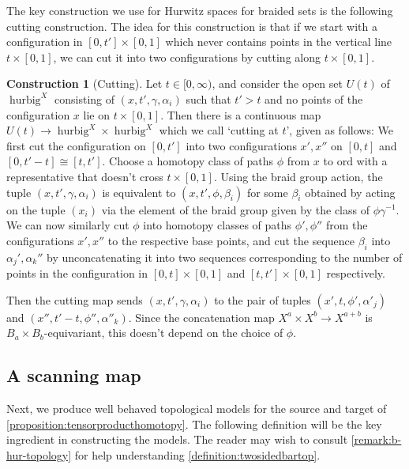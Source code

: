 \documentclass[12 pt]{amsart}
\theoremstyle{plain}
\theoremstyle{definition}
\newtheorem{construction}[theorem]{Construction}
\theoremstyle{remark}
\numberwithin{equation}{section}
\DeclareMathOperator\conf{Conf}
\begin{document}
The key construction we use for Hurwitz spaces for braided sets is the following
cutting construction.
The idea for this construction is that if we start with a configuration in
$[0,t'] \times [0,1]$ which never contains points in the vertical line $t
\times[0,1]$, we can cut it into two configurations by cutting along $t
\times [0,1]$.
\begin{construction}[Cutting]\label{construction:cutting}
	Let $t \in [0,\infty)$, and consider the open set $U(t)$ of $\operatorname{hurbig}^X$ consisting of  $(x,t',\gamma,\alpha_i)$ such that $t'>t$ and no points of the configuration $x$ lie on $t\times [0,1]$. Then there is a continuous map $U(t)\to \operatorname{hurbig}^X\times \operatorname{hurbig}^X$ which we call `cutting at $t$', given as follows: We first cut the configuration on $[0,t']$ into two configurations $x',x''$ on $[0,t]$ and $[0,t'-t]\cong [t,t']$. Choose a homotopy class of paths $\phi$ from $x$ to $\mathrm{ord}$ with a representative that doesn't cross $t\times [0,1]$. 
	Using the braid group action, the tuple $(x,t',\gamma,\alpha_i)$ is
	equivalent to $(x,t',\phi,\beta_i)$ for some $\beta_i$ obtained by
	acting on the tuple $(x_i)$ via the element of the braid group given by
	the class of $\phi \gamma^{-1}$. We can now similarly cut $\phi$ into
	homotopy classes of paths $\phi',\phi''$ from the configurations
	$x',x''$ to the respective base points, and cut the sequence $\beta_i$
	into $\alpha_j',\alpha_k''$ by unconcatenating it into two sequences corresponding to the number of points in the configuration in $[0,t]\times [0,1]$ and $[t,t']\times [0,1]$ respectively. %
	
	Then the cutting map sends $(x,t',\gamma,\alpha_i)$ to
	the pair of tuples
	$(x',t,\phi',\alpha'_j)$ and $(x'',t'-t,\phi'',\alpha''_k)$. Since the
	concatenation map $X^a\times X^{b} \to X^{a+b}$ is $B_a\times B_b$-equivariant, this doesn't depend on the choice of $\phi$.
\end{construction}


\subsection{A scanning map}
Next, we produce well behaved topological models for the source and target of
\autoref{proposition:tensorproducthomotopy}. The following definition will be
the key ingredient in constructing the models.
The reader may wish to consult \autoref{remark:b-hur-topology}
for help understanding \autoref{definition:twosidedbartop}.
\end{document}
